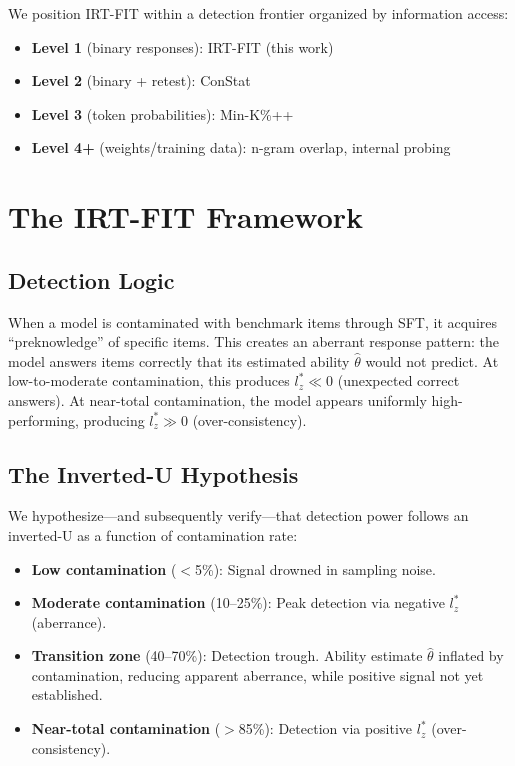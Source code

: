 \documentclass[11pt,a4paper]{article}
\begin{document}
We position \textsc{IRT-FIT} within a detection frontier organized by information access:
\begin{itemize}
    \item \textbf{Level 1} (binary responses): IRT-FIT (this work)
    \item \textbf{Level 2} (binary + retest): ConStat \citep{dekoninck2024constat}
    \item \textbf{Level 3} (token probabilities): Min-K\%++ \citep{shi2024detecting}
    \item \textbf{Level 4+} (weights/training data): n-gram overlap, internal probing
\end{itemize}

\section{The IRT-FIT Framework}

\subsection{Detection Logic}

When a model is contaminated with benchmark items through SFT, it acquires ``preknowledge'' of specific items.
This creates an aberrant response pattern: the model answers items correctly that its estimated ability $\hat{\theta}$ would not predict.
At low-to-moderate contamination, this produces $l_{z}^{*} \ll 0$ (unexpected correct answers).
At near-total contamination, the model appears uniformly high-performing, producing $l_{z}^{*} \gg 0$ (over-consistency).

\subsection{The Inverted-U Hypothesis}

We hypothesize---and subsequently verify---that detection power follows an inverted-U as a function of contamination rate:
\begin{itemize}
    \item \textbf{Low contamination} ($<$5\%): Signal drowned in sampling noise.
    \item \textbf{Moderate contamination} (10--25\%): Peak detection via negative $l_{z}^{*}$ (aberrance).
    \item \textbf{Transition zone} (40--70\%): Detection trough. Ability estimate $\hat{\theta}$ inflated by contamination, reducing apparent aberrance, while positive signal not yet established.
    \item \textbf{Near-total contamination} ($>$85\%): Detection via positive $l_{z}^{*}$ (over-consistency).
\end{itemize}
\end{document}
